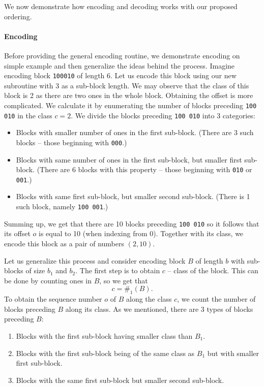 We now demonstrate how encoding and decoding works with our proposed ordering.

\paragraph{Encoding}

Before providing the general encoding routine, we demonstrate encoding on
simple example and then generalize the ideas behind the process. Imagine encoding
block {\tt 100010} of length 6. Let us encode this block using our new
subroutine with 3 as a sub-block length. We may observe that the class of this
block is 2 as there are two ones in the whole block. Obtaining the offset is
more complicated. We calculate it by enumerating the number of blocks preceding
{\tt 100 010} in the class $c=2$. We divide the blocks preceding {\tt 100 010}
into 3 categories:

\begin{itemize}
    \item Blocks with smaller number of ones in the first sub-block.
    (There are 3 such blocks -- those beginning with {\tt 000}.)
    \item Blocks with same number of ones in the first sub-block, but smaller first sub-block.
    (There are 6 blocks with this property -- those beginning with {\tt 010} or {\tt 001}.)
    \item Blocks with same first sub-block, but smaller second sub-block.
    (There is 1 such block, namely {\tt 100 001}.)
\end{itemize}

Summing up, we get that there are 10 blocks preceding {\tt 100 010} so it follows
that its offset $o$ is equal to 10 (when indexing from 0). Together with its class,
we encode this block as a pair of numbers $(2, 10)$.

Let us generalize this process and consider encoding block $B$ of length $b$
with sub-blocks of size $b_1$ and $b_2$. The first step is to obtain $c$ --
class of the block. This can be done by counting ones in $B$, so we get that
$$c=\#_1(B).$$ To obtain the sequence number $o$ of $B$ along the class $c$,
we count the number of blocks preceding $B$ along its class. As we mentioned,
there are 3 types of blocks preceding $B$:

\begin{enumerate}
    \item Blocks with the first sub-block having smaller class than $B_1$.
    \label{chapter3:encoding:1}
    \item Blocks with the first sub-block being of the same class as $B_1$
    but with smaller first sub-block. \label{chapter3:encoding:2}
    \item Blocks with the same first sub-block but smaller second sub-block.
    \label{chapter3:encoding:3}
\end{enumerate}

